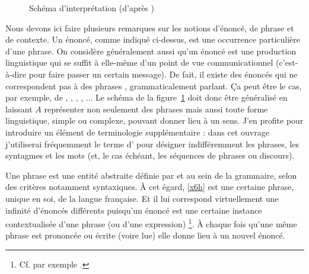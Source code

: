 \begin{refsegment}



 \begin{figure}[h]
 \begin{center}
\scalebox{.9}{\pstree[treemode=U,arrows=<-,levelsep=1.7cm,nodesepA=3pt,linewidth=1.6pt,linecolor=darkgray]{\TR{sens de $A$ dans $X$}}{%
  \pstree[nodesepB=3pt,nodesepA=0pt]{\TR{\psset{linewidth=1pt}\boitealu{\sffamily\begin{tabular}{c}Description sémantique\\d'une langue \textit{L}\end{tabular}}}}{%
\TR{phrase $A$} %
\TR{contexte $X$}} %
}}
 \end{center}
\caption{Schéma d'interprétation (d'après \citealt{Ducrot:84})}\label{schemaDucrot1}
 \end{figure}



Nous devons ici faire plusieurs remarques sur les notions d'énoncé, de phrase et de contexte.  Un énoncé, comme indiqué ci-dessus, est  une occurrence particulière d'une phrase.  On considère généralement aussi qu'un énoncé est une production linguistique qui se suffit à elle-même d'un point de vue communicationnel (c'est-à-dire pour faire passer un certain message).  De fait, il existe des énoncés qui ne correspondent pas à des phrases , grammaticalement parlant.  Ça peut être le cas, par exemple, de
, , , , ...
Le schéma de la figure~\ref{schemaDucrot1} doit donc être généralisé en laissant $A$ représenter non seulement des phrases mais aussi toute forme linguistique, simple ou complexe, pouvant donner lieu à  un sens.  J'en profite pour introduire un élément de terminologie supplémentaire : dans cet ouvrage j'utiliserai fréquemment le terme d' pour désigner indifféremment les phrases, les syntagmes et les mots (et, le cas échéant, les séquences de phrases ou discours). 

Une phrase est une entité abstraite définie par et au sein de la grammaire, selon des critères notamment syntaxiques.  À cet égard, \ref{x6h} est une certaine phrase, unique en soi, de la langue française.
Et il lui correspond virtuellement une infinité d'énoncés
différents  puisqu'un énoncé est une certaine instance contextualisée d'une phrase (ou d'une expression)%
\footnote{Cf. par exemple \citet[p.~174]{Ducrot:84}.}.
À chaque fois qu'une même phrase est prononcée ou écrite (voire lue) elle donne lieu à un nouvel énoncé.


\end{refsegment}
